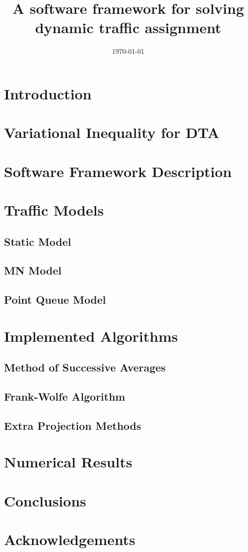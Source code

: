 \documentclass[onecolumn,10pt]{IEEEtran}
\title{A software framework for solving dynamic traffic assignment}
\author{}
\date{\today}
\renewcommand{\:}{\mathrel{\coloneqq}}
\renewcommand{\=}{\ensuremath{\eqqcolon}}
\begin{document}
\maketitle
\begin{abstract}

\end{abstract}

\section{Introduction}\label{sec:intro}

\section{Variational Inequality for DTA}

\section{Software Framework Description}

\section{Traffic Models}

\subsection{Static Model}
\subsection{MN Model}
\subsection{Point Queue Model}

\section{Implemented Algorithms}
\subsection{Method of Successive Averages}
\subsection{Frank-Wolfe Algorithm}
\subsection{Extra Projection Methods}

\section{Numerical Results}

\section{Conclusions}\label{sec:concl}


\section*{Acknowledgements}



\end{document}
